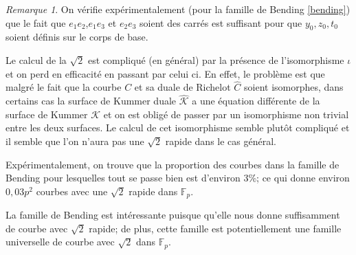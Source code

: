 \documentclass[a4paper]{article}
\newtheorem{lemme}[theoreme]{Lemme}
\newtheorem{corollaire}[theoreme]{Corollaire}
\theoremstyle{definition}
\theoremstyle{remark}
\newtheorem{remarque}{Remarque}
\numberwithin{equation}{section}
\begin{document}
%
%
%
%
%
\begin{remarque}
On vérifie expérimentalement (pour la famille de Bending \ref{bending}) que le fait que $e_1e_2$,$e_1e_3$ et $e_2e_3$ soient des carrés est suffisant pour que $y_0,z_0,t_0$ soient définis sur le corps de base.
\end{remarque}

Le calcul de la $\sqrt{2}$ est compliqué (en général) par la présence de l'isomorphisme $\iota$ et on perd en efficacité en passant par celui ci.
En effet, le problème est que malgré le fait que la courbe $C$ et sa duale de Richelot $\hat{C}$ soient isomorphes, dans certains cas la surface de Kummer duale $\hat{\mathcal{K}}$ a une équation différente de la surface de Kummer $\mathcal{K}$ et on est obligé de passer par un isomorphisme non trivial entre les deux surfaces.
Le calcul de cet isomorphisme semble plutôt compliqué et il semble que l'on n'aura pas une $\sqrt{2}$ rapide dans le cas général.

Expérimentalement, on trouve que la proportion des courbes dans la famille de Bending pour lesquelles tout se passe bien est d'environ 3\%; ce qui donne environ $0,03p^2$ courbes avec une $\sqrt{2}$ rapide dans $\mathbb{F}_p$.

La famille de Bending est intéressante puisque qu'elle nous donne suffisamment de courbe avec $\sqrt{2}$ rapide; de plus, cette famille est potentiellement une famille universelle de courbe avec $\sqrt{2}$ dans $\mathbb{F}_p$.
\end{document}
